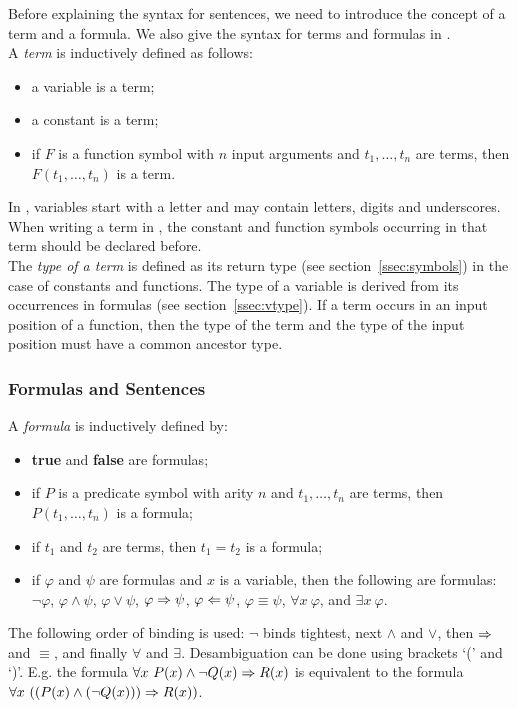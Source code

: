 \documentclass[a4]{article}
\begin{document}
Before explaining the syntax for sentences, we need to introduce the concept of a term and a formula. We also give the syntax for terms and formulas in \idp.\\


A \emph{term} is inductively defined as follows:
\begin{itemize}
	\item a variable is a term;
	\item a constant is a term;
	\item if $F$ is a function symbol with $n$ input arguments and $t_1, \ldots, t_n$ are terms, then $F(t_1,\ldots,t_n)$ is a term. 
\end{itemize}
In \idp, variables start with a letter and may contain letters, digits and underscores. When writing a term in \idp, the constant and function symbols occurring in that term should be declared before. \\
The \emph{type of a term} is defined as its return type (see section~\ref{ssec:symbols}) in the case of constants and functions. The type of a variable is derived from its occurrences in formulas (see section~\ref{ssec:vtype}). If a term occurs in an input position of a function, then the type of the term and the type of the input position must have a common ancestor type. 

\subsubsection{Formulas and Sentences}

A \emph{formula} is inductively defined by:
\begin{itemize}
	\item \textbf{true} and \textbf{false} are formulas;
	\item if $P$ is a predicate symbol with arity $n$ and $t_1,\ldots,t_n$ are terms, then $P(t_1,\ldots,t_n)$ is a formula;
	\item if $t_1$ and $t_2$ are terms, then $t_1 = t_2$ is a formula;
	\item if $\varphi$ and $\psi$ are formulas and $x$ is a variable, then the following are formulas: $\lnot \varphi$, $\varphi \land \psi$, $\varphi \lor \psi$, $\varphi \Rightarrow \psi$, $\varphi \Leftarrow \psi$, $\varphi \equiv \psi$, $\forall x\ \varphi$, and $\exists x\ \varphi$.
\end{itemize}
The following order of binding is used: $\lnot$ binds tightest, next $\land$ and $\lor$, then $\Rightarrow$ and $\equiv$, and finally $\forall$ and $\exists$. Desambiguation can be done using brackets `(' and `)'. E.g. the formula $\forall x\ P(x) \land \lnot Q(x) \Rightarrow R(x)$ is equivalent to the formula $\forall x\ ((P(x) \land (\lnot Q(x))) \Rightarrow R(x))$.
\end{document}
